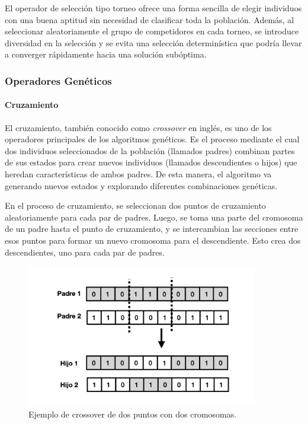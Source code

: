El operador de selección tipo torneo ofrece una forma sencilla de elegir individuos con una buena aptitud sin necesidad de clasificar toda la población. Además, al seleccionar aleatoriamente el grupo de competidores en cada torneo, se introduce diversidad en la selección y se evita una selección determinística que podría llevar a converger rápidamente hacia una solución subóptima.


\subsubsection{Operadores Genéticos}


\paragraph{Cruzamiento} 


El cruzamiento, también conocido como \emph{crossover} en inglés, es uno de los operadores principales de los algoritmos genéticos. Es el proceso mediante el cual dos individuos seleccionados de la población (llamados padres) combinan partes de sus estados para crear nuevos individuos (llamados descendientes o hijos) que heredan características de ambos padres. De esta manera, el algoritmo va generando nuevos estados y explorando diferentes combinaciones genéticas.

En el proceso de cruzamiento, se seleccionan dos puntos de cruzamiento aleatoriamente para cada par de padres. Luego, se toma una parte del cromosoma de un padre hasta el punto de cruzamiento, y se intercambian las secciones entre esos puntos para formar un nuevo cromosoma para el descendiente. Esto crea dos descendientes, uno para cada par de padres.


\begin{figure}
  \centering
  \includegraphics[width=0.9\textwidth]{images/crossOver.png}
  \caption{Ejemplo de crossover de dos puntos con dos cromosomas.}
  \label{fig:crossover}
\end{figure}


